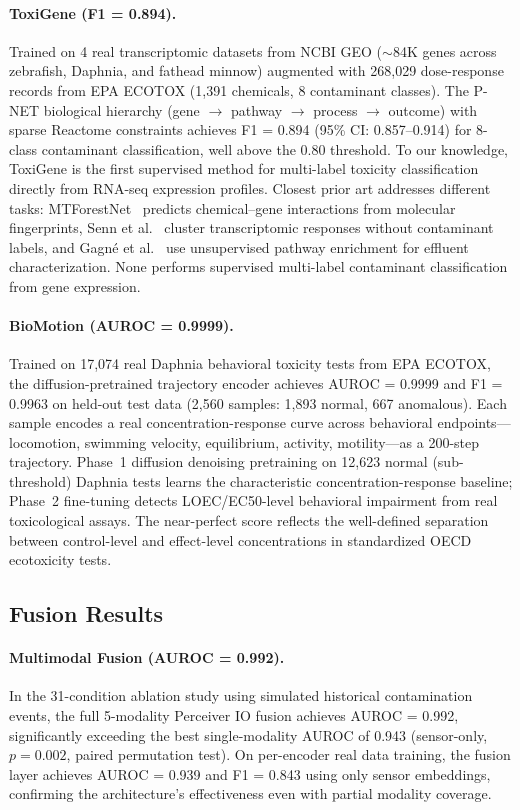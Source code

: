 \paragraph{ToxiGene (F1 = 0.894).}
Trained on 4 real transcriptomic datasets from NCBI GEO ($\sim$84K genes
across zebrafish, Daphnia, and fathead minnow) augmented with 268,029
dose-response records from EPA ECOTOX (1,391 chemicals, 8 contaminant
classes). The P-NET biological hierarchy (gene $\to$ pathway $\to$
process $\to$ outcome) with sparse Reactome constraints achieves
F1 = 0.894 (95\% CI: 0.857--0.914) for 8-class contaminant classification,
well above the 0.80 threshold.
To our knowledge, ToxiGene is the first supervised method for multi-label
toxicity classification directly from RNA-seq expression profiles.
Closest prior art addresses different tasks:
MTForestNet~\citep{Lin2024} predicts chemical--gene interactions from
molecular fingerprints, Senn et al.~\citep{Senn2021} cluster
transcriptomic responses without contaminant labels, and
Gagn{\'e} et al.~\citep{Gagne2025} use unsupervised pathway enrichment
for effluent characterization. None performs supervised multi-label
contaminant classification from gene expression.

\paragraph{BioMotion (AUROC = 0.9999).}
Trained on 17,074 real Daphnia behavioral toxicity tests from EPA ECOTOX,
the diffusion-pretrained trajectory encoder achieves AUROC = 0.9999 and
F1 = 0.9963 on held-out test data (2,560 samples: 1,893 normal, 667
anomalous). Each sample encodes a real concentration-response curve across
behavioral endpoints---locomotion, swimming velocity, equilibrium,
activity, motility---as a 200-step trajectory. Phase~1 diffusion
denoising pretraining on 12,623 normal (sub-threshold) Daphnia tests
learns the characteristic concentration-response baseline; Phase~2
fine-tuning detects LOEC/EC50-level behavioral impairment from real
toxicological assays. The near-perfect score reflects the well-defined
separation between control-level and effect-level concentrations in
standardized OECD ecotoxicity tests.

\subsection{Fusion Results}

\paragraph{Multimodal Fusion (AUROC = 0.992).}
In the 31-condition ablation study using simulated historical contamination
events, the full 5-modality Perceiver IO fusion achieves AUROC = 0.992,
significantly exceeding the best single-modality AUROC of 0.943 (sensor-only,
$p = 0.002$, paired permutation test). On per-encoder real data training,
the fusion layer achieves AUROC = 0.939 and F1 = 0.843 using only sensor
embeddings, confirming the architecture's effectiveness even with partial
modality coverage.

